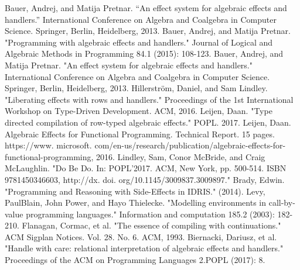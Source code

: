 \documentclass[12pt]{book}
\begin{document}
\newpage
\begin{thebibliography}{9}
Bauer, Andrej, and Matija Pretnar. ``An effect system for algebraic effects and handlers.'' International Conference on Algebra and Coalgebra in Computer Science. Springer, Berlin, Heidelberg, 2013.
Bauer, Andrej, and Matija Pretnar. "Programming with algebraic effects and handlers." Journal of Logical and Algebraic Methods in Programming 84.1 (2015): 108-123.
Bauer, Andrej, and Matija Pretnar. "An effect system for algebraic effects and handlers." International Conference on Algebra and Coalgebra in Computer Science. Springer, Berlin, Heidelberg, 2013.
Hillerstr\"{o}m, Daniel, and Sam Lindley. "Liberating effects with rows and handlers." Proceedings of the 1st International Workshop on Type-Driven Development. ACM, 2016.
Leijen, Daan. "Type directed compilation of row-typed algebraic effects." POPL. 2017.
Leijen, Daan. Algebraic Effects for Functional Programming. Technical Report. 15 pages. https://www. microsoft. com/en-us/research/publication/algebraic-effects-for-functional-programming, 2016.
Lindley, Sam, Conor McBride, and Craig McLaughlin. "Do Be Do. In: POPL'2017. ACM, New York, pp. 500-514. ISBN 9781450346603, http://dx. doi. org/10.1145/3009837.3009897."
Brady, Edwin. "Programming and Reasoning with Side-Effects in IDRIS." (2014).
Levy, PaulBlain, John Power, and Hayo Thielecke. "Modelling environments in call-by-value programming languages." Information and computation 185.2 (2003): 182-210.
Flanagan, Cormac, et al. "The essence of compiling with continuations." ACM Sigplan Notices. Vol. 28. No. 6. ACM, 1993.
Biernacki, Dariusz, et al. "Handle with care: relational interpretation of algebraic effects and handlers." Proceedings of the ACM on Programming Languages 2.POPL (2017): 8.
\end{thebibliography}
\end{document}
